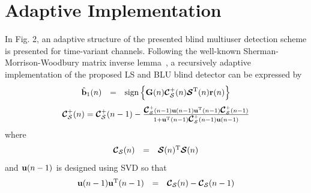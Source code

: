 \documentclass[a4paper,10pt,fleqn, twocolumn]{IEEETran}
\newcommand{\br}{{\mathbf r}}
\newcommand{\bb}{{\bf b}}
\newcommand{\bG}{{\bf G}}
\newcommand{\bu}{{\bf u}}
\newcommand{\bcC}{{\mbox {\boldmath ${\cal C}$}}}
\newcommand{\bcS}{{\mbox {\boldmath ${\cal S}$}}}
\begin{document}
\section{Adaptive Implementation\label{updatingG}}
\begin{figure}
\label{AMUDstruct}
\end{figure}
In Fig. 2, an adaptive structure of the presented blind multiuser
detection scheme is presented for time-variant channels. Following
the well-known Sherman-Morrison-Woodbury matrix inverse
lemma~\cite{Haykin96,Golu96}, a recursively adaptive
implementation of the proposed LS and BLU blind detector can be
expressed by
\begin{equation}\hspace{-0.0in}
\begin{array}{rcl}
\hat{\bb}_1(n)&=&\mbox{sign}\left\{\bG(n)\bcC_{\cal
S}^{+}(n)\bcS^{\rm T}(n)\br(n)\right\}
\end{array}
\end{equation}
\begin{equation}\hspace{-0.0in}
\begin{array}{l}
\bcC_{\cal S}^{+}(n)=\bcC_{\cal S}^{+}(n-1)-\frac{\bcC_{\cal
S}^{+}(n-1)\bu(n-1)\bu^{\rm T}(n-1)\bcC_{\cal
S}^{+}(n-1)}{1+\bu^{\rm T}(n-1)\bcC_{\cal S}^{+}(n-1)\bu(n-1)}
\end{array}\label{adaptiveLS}
\end{equation}
\noindent where
\begin{equation}\hspace{-0.0in}
\begin{array}{rcl}
\bcC_{\cal S}(n)&=&\bcS(n)^{\rm T}\bcS(n)
\end{array}
\end{equation}
 \noindent and $\bu(n-1)$ is designed using SVD so that
\begin{equation}\hspace{-0.00in}
\begin{array}{rcl}
\bu(n-1)\bu^{\rm T}(n-1)&=&\bcC_{\cal S}(n)-\bcC_{\cal S}(n-1)
\end{array}
\end{equation}
\end{document}
